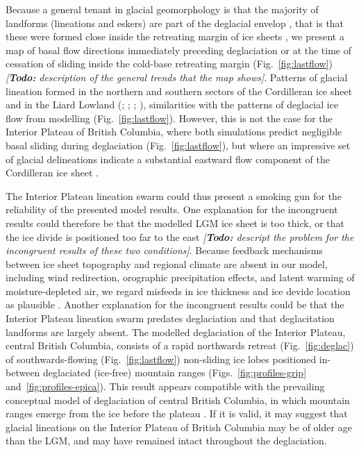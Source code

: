 \documentclass[tc, manuscript]{copernicus}
\newcommand{\todo}[1]{\emph{[\textbf{Todo:} #1]}}
\begin{document}
Because a general tenant in glacial geomorphology is that the majority of
landforms (lineations and eskers) are part of the deglacial envelop
\citep[terminology from]{Kleman.etal.2006}, that is that these were formed
close inside the retreating margin of ice sheets \citep{Boulton.Clark.1990,
Kleman.etal.1997, Kleman.etal.2010}, we present a map of basal flow directions
immediately preceding deglaciation or at the time of cessation of sliding
inside the cold-base retreating margin (Fig.~\ref{fig:lastflow})
\todo{description of the general trends that the map shows}. Patterns of
glacial lineation formed in the northern and southern sectors of the
Cordilleran ice sheet and in the Liard Lowland (\citealp{Prest.etal.1968};
\citealp[Fig.~1.12]{Clague.1989}; \citealp[Fig.~2]{Kleman.etal.2010};
\citealp[Fig.~2]{Margold.etal.2013}), similarities with the patterns of
deglacial ice flow from modelling (Fig.~\ref{fig:lastflow}). However, this is
not the case for the Interior Plateau of British Columbia, where both
simulations predict negligible basal sliding during deglaciation
(Fig.~\ref{fig:lastflow}), but where an impressive set of glacial delineations
indicate a substantial eastward flow component of the Cordilleran ice sheet
\citep{Prest.etal.1968, Kleman.etal.2010}.

The Interior Plateau lineation swarm could thus present a smoking gun for the
reliability of the presented model results. One explanation for the incongruent
results could therefore be that the modelled LGM ice sheet is too thick, or
that the ice divide is positioned too far to the east \todo{descript the
problem for the incongruent results of these two conditions}. Because feedback
mechanisms between ice sheet topography and regional climate are absent in our
model, including wind redirection, orographic precipitation effects, and latent
warming of moisture-depleted air, we regard misfeeds in ice thickness and ice
devide location as plausible \citep{Seguinot.etal.2014}. Another explanation
for the incongruent results could be that the Interior Plateau lineation swarm
predates deglaciation and that deglacitation landforms are largely absent. The
modelled deglaciation of the Interior Plateau, central British Columbia,
consists of a rapid northwards retreat (Fig.~\ref{fig:deglac}) of
southwards-flowing (Fig.~\ref{fig:lastflow}) non-sliding ice lobes positioned
in-between deglaciated (ice-free) mountain ranges
(Figs.~\ref{fig:profiles-grip} and~\ref{fig:profiles-epica}). This result
appears compatible with the prevailing conceptual model of deglaciation of
central British Columbia, in which mountain ranges emerge from the ice before
the plateau \citep[Fig.~7]{Fulton.1991}. If it is valid, it may suggest that
glacial lineations on the Interior Plateau of British Columbia may be of older
age than the LGM, and may have remained intact throughout the deglaciation.
\end{document}
